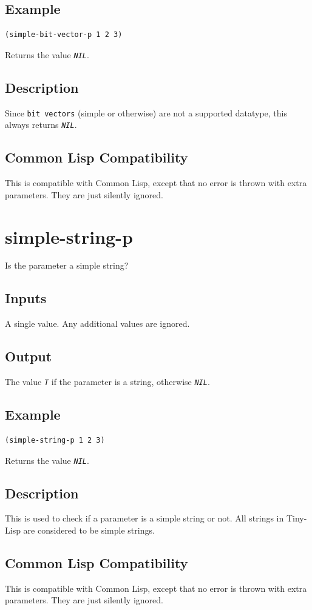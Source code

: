 \documentclass[10pt, openany]{book}
\newcommand{\constant}[1]{\emph{\texttt{#1}}}
\newcommand{\datatype}[1]{\texttt{#1}}
\newcommand{\tl}{Tiny-Lisp}
\newcommand{\cl}{Common Lisp}
\begin{document}
\subsection{Example}
\begin{lstlisting}
(simple-bit-vector-p 1 2 3)
\end{lstlisting}
Returns the value \constant{NIL}.
\subsection{Description}
Since \datatype{bit vectors} (simple or otherwise) are not a supported datatype, this always returns \constant{NIL}.
\subsection{Common Lisp Compatibility}
This is compatible with \cl, except that no error is thrown with extra parameters.  They are just silently ignored.

\section{simple-string-p}
Is the parameter a simple string?
\subsection{Inputs}
A single value.  Any additional values are ignored.
\subsection{Output}
The value \constant{T} if the parameter is a string, otherwise \constant{NIL}.
\subsection{Example}
\begin{lstlisting}
(simple-string-p 1 2 3)
\end{lstlisting}
Returns the value \constant{NIL}.
\subsection{Description}
This is used to check if a parameter is a simple string or not.  All strings in \tl{} are considered to be simple strings.
\subsection{Common Lisp Compatibility}
This is compatible with \cl, except that no error is thrown with extra parameters.  They are just silently ignored.
\end{document}
